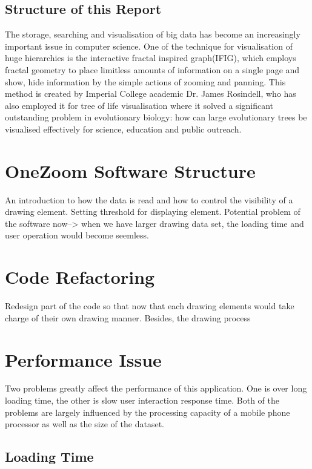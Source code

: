 \documentclass[MSc]{icldt}
\begin{document}
\section{Structure of this Report}

The storage, searching and visualisation of big data has become an increasingly important issue in computer science. One of the technique for visualisation of huge hierarchies is the interactive fractal inspired graph(IFIG), which employs fractal geometry to place limitless amounts of information on a single page and show, hide information by the simple actions of zooming and panning. This method is created by Imperial College academic Dr. James Rosindell, who has also employed it for tree of life visualisation where it solved a significant outstanding problem in evolutionary biology: how can large evolutionary trees be visualised effectively for science, education and public outreach.

\chapter{OneZoom Software Structure}

An introduction to how the data is read and how to control the visibility of a drawing element. 
Setting threshold for displaying element. 
Potential problem of the software now--> when we have larger drawing data set, the loading time and user operation would become seemless.

\chapter{Code Refactoring}

Redesign part of the code so that now that each drawing elements would take charge of their own drawing manner. Besides, the drawing process 

\chapter{Performance Issue}

Two problems greatly affect the performance of this application. One is over long loading time, the other is slow user interaction response time. Both of the problems are largely influenced by the processing capacity of a mobile phone processor as well as the size of the dataset. 

\section{Loading Time}
\end{document}
